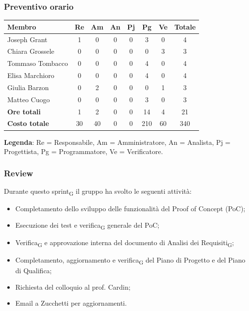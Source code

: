 \documentclass[11pt,a4paper]{article}
\newcommand{\gls}[1]{#1\textsubscript{G}}
\begin{document}
\subsubsection{Preventivo orario}
\begin{center}
    \begin{tabular}{|l|c|c|c|c|c|c|c|}
        \hline
        \textbf{Membro} & \textbf{Re} & \textbf{Am} & \textbf{An} & \textbf{Pj} & \textbf{Pg} & \textbf{Ve} & \textbf{Totale} \\
        \hline
        Joseph Grant & 1 & 0 & 0 & 0 & 3 & 0 & 4 \\
        \hline
        Chiara Grossele & 0 & 0 & 0 & 0 & 0 & 3 & 3 \\
        \hline
        Tommaso Tombacco & 0 & 0 & 0 & 0 & 4 & 0 & 4 \\
        \hline
        Elisa Marchioro & 0 & 0 & 0 & 0 & 4 & 0 & 4 \\
        \hline
        Giulia Barzon & 0 & 2 & 0 & 0 & 0 & 1 & 3 \\
        \hline
        Matteo Cuogo & 0 & 0 & 0 & 0 & 3 & 0 & 3 \\
        \hline
        \textbf{Ore totali} & 1 & 2 & 0 & 0 & 14 & 4 & 21 \\
        \hline
        \textbf{Costo totale} & 30 & 40 & 0 & 0 & 210 & 60 & 340 \\
        \hline
    \end{tabular}
\end{center}

\noindent \textbf{Legenda}: Re = Responsabile, Am = Amministratore, An = Analista, Pj = Progettista, Pg = Programmatore, Ve = Verificatore.

\subsubsection{Review}
Durante questo \gls{sprint} il gruppo ha svolto le seguenti attività:
\begin{itemize}
    \item Completamento dello sviluppo delle funzionalità del Proof of Concept (PoC);
    \item Esecuzione dei test e \gls{verifica} generale del PoC;
    \item \gls{Verifica} e approvazione interna del documento di \gls{Analisi dei Requisiti};
    \item Completamento, aggiornamento e \gls{verifica} del Piano di Progetto e del Piano di Qualifica;
    \item Richiesta del colloquio al prof. Cardin;
    \item Email a Zucchetti per aggiornamenti.
\end{itemize}
\end{document}

